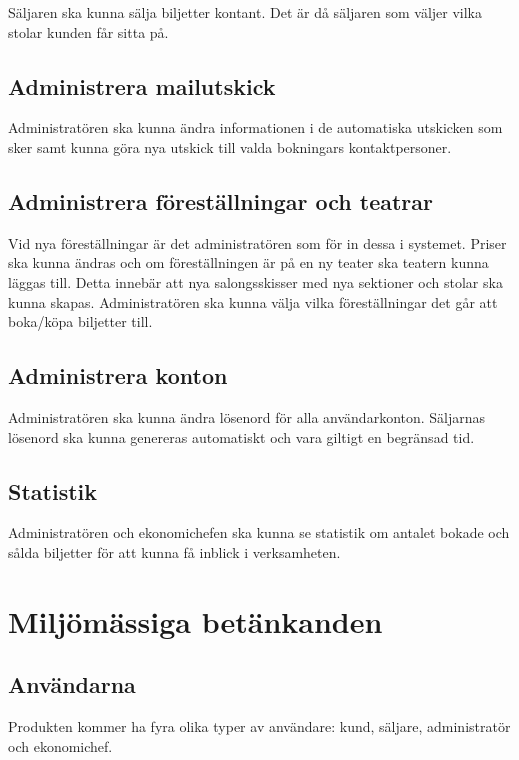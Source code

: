 \documentclass[a4paper, twoside, 11pt, titlepage]{article}
\begin{document}
	Säljaren ska kunna sälja biljetter kontant. Det är då säljaren som väljer vilka stolar kunden får sitta på.

	\subsection{Administrera mailutskick}


	Administratören ska kunna ändra informationen i de automatiska utskicken som sker samt kunna göra nya utskick till valda bokningars kontaktpersoner.

	\subsection{Administrera föreställningar och teatrar}


	Vid nya föreställningar är det administratören som  för in dessa i systemet. Priser ska kunna ändras och om föreställningen är på en ny teater ska teatern kunna läggas till. Detta innebär att nya salongsskisser med nya sektioner och stolar ska kunna skapas. Administratören ska kunna välja vilka föreställningar det går att boka/köpa biljetter till.

	\subsection{Administrera konton}


	Administratören ska kunna ändra lösenord för alla användarkonton. Säljarnas lösenord ska kunna genereras automatiskt och vara giltigt en begränsad tid.

	\subsection{Statistik}


	Administratören och ekonomichefen ska kunna se statistik om antalet bokade och sålda biljetter för att kunna få inblick i verksamheten.

\clearpage
\section{Miljömässiga betänkanden}



	\subsection{Användarna}


	Produkten kommer ha fyra olika typer av användare: kund, säljare, administratör och ekonomichef.
\end{document}
